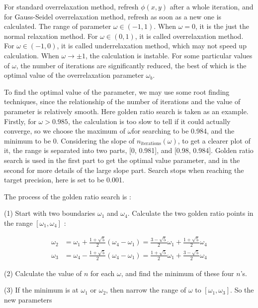 \documentclass[12pt, graphicx]{article}
\begin{document}
For standard overrelaxation method, refresh $\phi(x,y)$ after a whole iteration, and for Gauss-Seidel overrelaxation method, refresh as soon as a new one is calculated. The range of parameter $\omega\in(-1,1)$. When $\omega=0$, it is the just the normal relaxation method. For $\omega\in(0,1)$, it is called overrelaxation method. For $\omega\in(-1,0)$, it is called underrelaxation method, which may not speed up calculation. When $\omega\to\pm1$, the calculation is instable. For some particular values of $\omega$, the number of iterations are significantly reduced, the best of which is the optimal value of the overrelaxation parameter $\omega_b$.\par
To find the optimal value of the parameter, we may use some root finding techniques, since the relationship of the number of iterations and the value of parameter is relatively smooth. Here golden ratio search is taken as an example. Firstly, for $\omega>0.985$, the calculation is too slow to tell if it could actually converge, so we choose the maximum of $\omega$for searching to be 0.984, and the minimum to be 0. Considering the slope of $n_\mathrm{iterations}(\omega)$, to get a clearer plot of it, the range is separated into two parts, [0, 0.981], and [0.98, 0.984]. Golden ratio search is used in the first part to get the optimal value parameter, and in the second for more details of the large slope part. Search stops when reaching the target precision, here is set to be 0.001.\par
The process of the golden ratio search is : \par
(1) Start with two boundaries $\omega_1$ and $\omega_4$. Calculate the two golden ratio points in the range $[\omega_1,\omega_4]$ : 

\begin{equation}
\begin{aligned}
\omega_2&=\omega_1+\frac{1+\sqrt{5}}{2}(\omega_4-\omega_1)=\frac{3-\sqrt{5}}{2}\omega_1+\frac{1+\sqrt{5}}{2}\omega_4\\
\omega_3&=\omega_4-\frac{1+\sqrt{5}}{2}(\omega_4-\omega_1)=\frac{1+\sqrt{5}}{2}\omega_1+\frac{3-\sqrt{5}}{2}\omega_4
\end{aligned}
\end{equation}

(2) Calculate the value of $n$ for each $\omega$, and find the minimum of these four $n$'s. \par
(3) If the minimum is at $\omega_1$ or $\omega_2$, then narrow the range of $\omega$ to $[\omega_1,\omega_3]$. So the new parameters
\end{document}

